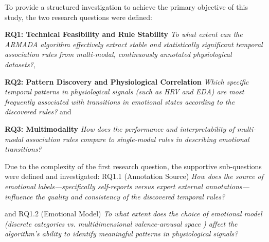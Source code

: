 \documentclass{isd}
\begin{document}
To provide a structured investigation to achieve the primary objective of this study, the two research questions were defined:

\textbf{RQ1: Technical Feasibility and Rule Stability}
\textit{To what extent can the ARMADA algorithm effectively extract stable and statistically significant temporal association rules from multi-modal, continuously annotated physiological datasets?},

{\textbf{RQ2: Pattern Discovery and Physiological Correlation} \textit{Which specific temporal patterns in physiological signals (such as HRV and EDA) are most frequently associated with transitions in emotional states according to the discovered rules?} and

{\textbf{RQ3: Multimodality} \textit{How does the performance and interpretability of multi-modal association rules compare to single-modal rules in describing emotional transitions?}

Due to the complexity of the first research question, the supportive sub-questions were defined and investigated: RQ1.1 (Annotation Source) \textit{How does the source of emotional labels—specifically self-reports versus expert external annotations—influence the quality and consistency of the discovered temporal rules?}} and RQ1.2 (Emotional Model) \textit{To what extent does the choice of emotional model (discrete categories \cite{ekman1992argument} vs. multidimensional valence-arousal space \cite{russell1980circumplex}) affect the algorithm's ability to identify meaningful patterns in physiological signals?}


}
\end{document}
